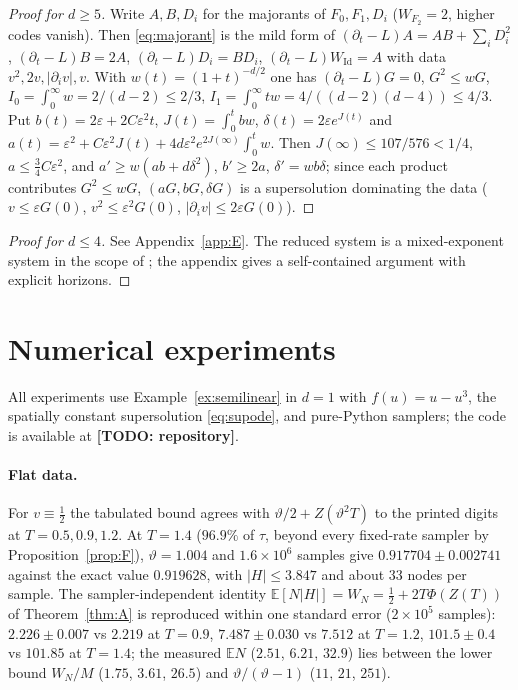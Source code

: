 \documentclass[11pt]{article}
\theoremstyle{definition}
\theoremstyle{remark}
\newcommand{\E}{\mathbb{E}}
\newcommand{\Id}{\mathrm{Id}}
\newcommand{\todo}[1]{\textbf{[TODO: #1]}}
\begin{document}
\begin{proof}[Proof for $d\ge5$]
Write $A,B,D_i$ for the majorants of $F_0,F_1,D_i$ ($W_{F_2}=2$, higher codes
vanish). Then \eqref{eq:majorant} is the mild form of
$(\partial_t-L)A=AB+\sum_iD_i^2$, $(\partial_t-L)B=2A$,
$(\partial_t-L)D_i=BD_i$, $(\partial_t-L)W_\Id=A$ with data
$v^2,2v,|\partial_iv|,v$. With $w(t)=(1+t)^{-d/2}$ one has
$(\partial_t-L)G=0$, $G^2\le wG$, $I_0=\int_0^\infty w=2/(d-2)\le2/3$,
$I_1=\int_0^\infty tw=4/((d-2)(d-4))\le4/3$. Put
$b(t)=2\varepsilon+2C\varepsilon^2t$, $J(t)=\int_0^tbw$,
$\delta(t)=2\varepsilon e^{J(t)}$ and
$a(t)=\varepsilon^2+C\varepsilon^2J(t)+4d\varepsilon^2e^{2J(\infty)}\int_0^tw$.
Then $J(\infty)\le107/576<1/4$, $a\le\frac34C\varepsilon^2$,
and $a'\ge w(ab+d\delta^2)$, $b'\ge2a$, $\delta'=wb\delta$; since each
product contributes $G^2\le wG$, $(aG,bG,\delta G)$ is a supersolution
dominating the data ($v\le\varepsilon G(0)$, $v^2\le\varepsilon^2G(0)$,
$|\partial_iv|\le2\varepsilon G(0)$).
\end{proof}
\begin{proof}[Proof for $d\le4$]
See Appendix~\ref{app:E}. The reduced system is a mixed-exponent
system in the scope of \cite{EL95}; the appendix gives a self-contained
argument with explicit horizons.
\end{proof}

\section{Numerical experiments}\label{sec:numerics}

All experiments use Example~\ref{ex:semilinear} in $d=1$ with
$f(u)=u-u^3$, the spatially constant supersolution \eqref{eq:supode}, and
pure-Python samplers; the code is available at \todo{repository}.

\paragraph{Flat data.} For $v\equiv\frac12$ the tabulated bound agrees
with $\vartheta/2+Z(\vartheta^2T)$ to the printed digits at
$T=0.5,0.9,1.2$. At $T=1.4$ ($96.9\%$ of $\tau$, beyond every fixed-rate
sampler by Proposition~\ref{prop:F}), $\vartheta=1.004$ and $1.6\times10^6$
samples give $0.917704\pm0.002741$ against the exact value $0.919628$,
with $|H|\le3.847$ and about $33$ nodes per sample. The sampler-independent
identity $\E[N|H|]=W_N=\frac12+2T\Phi(Z(T))$ of Theorem~\ref{thm:A} is
reproduced within one standard error ($2\times10^5$ samples): $2.226\pm
0.007$ vs $2.219$ at $T=0.9$, $7.487\pm0.030$ vs $7.512$ at $T=1.2$,
$101.5\pm0.4$ vs $101.85$ at $T=1.4$; the measured $\E N$ ($2.51$, $6.21$,
$32.9$) lies between the lower bound $W_N/M$ ($1.75$, $3.61$, $26.5$) and
$\vartheta/(\vartheta-1)$ ($11$, $21$, $251$).
\end{document}
